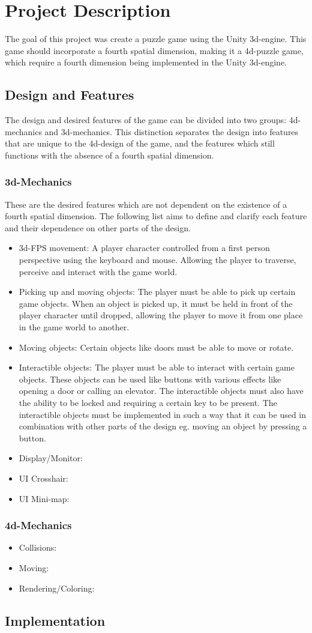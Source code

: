 \section{Project Description}
The goal of this project was create a puzzle game using the Unity 3d-engine. This game should incorporate a fourth spatial dimension, making it a 4d-puzzle game, which require a fourth dimension being implemented in the Unity 3d-engine.
\subsection{Design and Features}
The design and desired features of the game can be divided into two groups: 4d-mechanics and 3d-mechanics. This distinction separates the design into features that are unique to the 4d-design of the game, and the features which still functions with the absence of a fourth spatial dimension.
\subsubsection{3d-Mechanics}
These are the desired features which are not dependent on the existence of a fourth spatial dimension. 
The following list aims to define and clarify each feature and their dependence on other parts of the design.
\begin{itemize}
	\item 3d-FPS movement: A player character controlled from a first person perspective using the keyboard and mouse. Allowing the player to traverse, perceive and interact with the game world.
	\item Picking up and moving objects: The player must be able to pick up certain game objects. When an object is picked up, it must be held in front of the player character until dropped, allowing the player to move it from one place in the game world to another.
	\item Moving objects: Certain objects like doors must be able to move or rotate.
	\item Interactible objects: The player must be able to interact with certain game objects. These objects can be used like buttons with various effects like opening a door or calling an elevator. The interactible objects must also have the ability to be locked and requiring a certain key to be present. The interactible objects must be implemented in such a way that it can be used in combination with other parts of the design eg. moving an object by pressing a button.
	\item Display/Monitor: 
	\item UI Crosshair:
	\item UI Mini-map:  
	
\end{itemize}
\subsubsection{4d-Mechanics}
\begin{itemize}
	\item Collisions: 
	\item Moving:
	\item Rendering/Coloring:
\end{itemize}
\subsection{Implementation}
